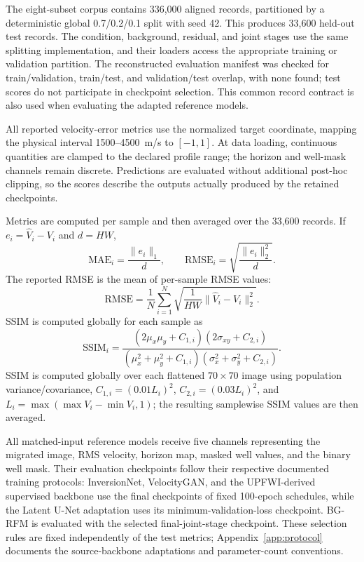 The eight-subset corpus contains 336,000 aligned records, partitioned by a deterministic global 0.7/0.2/0.1 split with seed 42. This produces 33,600 held-out test records. The condition, background, residual, and joint stages use the same splitting implementation, and their loaders access the appropriate training or validation partition. The reconstructed evaluation manifest was checked for train/validation, train/test, and validation/test overlap, with none found; test scores do not participate in checkpoint selection. This common record contract is also used when evaluating the adapted reference models.

All reported velocity-error metrics use the normalized target coordinate, mapping the physical interval 1500--4500~m/s to $[-1,1]$. At data loading, continuous quantities are clamped to the declared profile range; the horizon and well-mask channels remain discrete. Predictions are evaluated without additional post-hoc clipping, so the scores describe the outputs actually produced by the retained checkpoints.

Metrics are computed per sample and then averaged over the 33,600 records. If $e_i=\hat V_i-V_i$ and $d=HW$,
\begin{equation}
\mathrm{MAE}_i=\frac{\|e_i\|_1}{d},
\qquad
\mathrm{RMSE}_i=\sqrt{\frac{\|e_i\|_2^2}{d}}.
\end{equation}
The reported RMSE is the mean of per-sample RMSE values:
\begin{equation}
\mathrm{RMSE}=\frac{1}{N}\sum_{i=1}^{N}
\sqrt{\frac{1}{HW}\|\hat V_i-V_i\|_2^2}.
\label{eq:eval-rmse}
\end{equation}
SSIM is computed globally for each sample as
\begin{equation}
\mathrm{SSIM}_i=
\frac{(2\mu_x\mu_y+C_{1,i})(2\sigma_{xy}+C_{2,i})}
{(\mu_x^2+\mu_y^2+C_{1,i})(\sigma_x^2+\sigma_y^2+C_{2,i})}.
\label{eq:eval-ssim}
\end{equation}
SSIM is computed globally over each flattened $70\times70$ image using population variance/covariance, $C_{1,i}=(0.01L_i)^2$, $C_{2,i}=(0.03L_i)^2$, and
$L_i=\max(\max V_i-\min V_i,1)$; the resulting samplewise SSIM values are then averaged.

All matched-input reference models receive five channels representing the migrated image, RMS velocity, horizon map, masked well values, and the binary well mask. Their evaluation checkpoints follow their respective documented training protocols: InversionNet, VelocityGAN, and the UPFWI-derived supervised backbone use the final checkpoints of fixed 100-epoch schedules, while the Latent U-Net adaptation uses its minimum-validation-loss checkpoint. BG-RFM is evaluated with the selected final-joint-stage checkpoint. These selection rules are fixed independently of the test metrics; Appendix~\ref{app:protocol} documents the source-backbone adaptations and parameter-count conventions.


